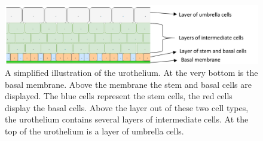 \begin{figure}[th]
	\center
	\includegraphics[scale=0.3]{figures/Urothelium.png}
	\caption[A simplified illustration of the urothelium]{A simplified illustration of the urothelium. At the very bottom is the basal membrane. Above the membrane the stem and basal cells are displayed. The blue cells represent the stem cells, the red cells display the basal cells. Above the layer out of these two cell types, the urothelium contains several layers of intermediate cells. At the top of the urothelium is a layer of umbrella cells.}
	\label{img:physiology_urothelium}
\end{figure}

